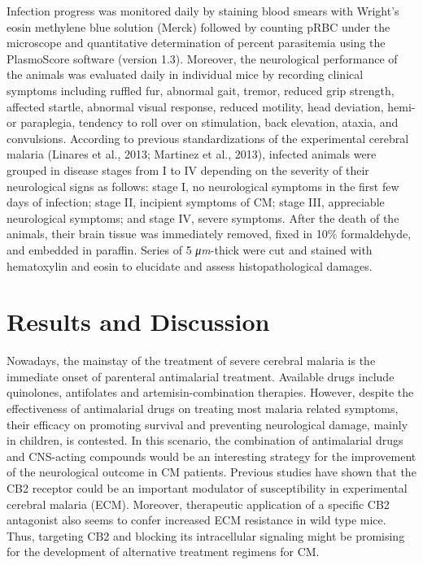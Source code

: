 \documentclass[empirical, authordate, issue]{jote-new-article}
\begin{document}
Infection progress was monitored daily by staining blood smears with Wright's eosin methylene blue solution (Merck) followed by counting pRBC under the microscope and quantitative determination of percent parasitemia using the PlasmoScore software (version 1.3). Moreover, the neurological performance of the animals was evaluated daily in individual mice by recording clinical symptoms including ruffled fur, abnormal gait, tremor, reduced grip strength, affected startle, abnormal visual response, reduced motility, head deviation, hemi- or paraplegia, tendency to roll over on stimulation, back elevation, ataxia, and convulsions. According to previous standardizations of the experimental cerebral malaria (Linares et al., 2013; Martinez et al., 2013), infected animals were grouped in disease stages from I to IV depending on the severity of their neurological signs as follows: stage I, no neurological symptoms in the first few days of infection; stage II, incipient symptoms of CM; stage III, appreciable neurological symptoms; and stage IV, severe symptoms. After the death of the animals, their brain tissue was immediately removed, fixed in 10\% formaldehyde, and embedded in paraffin. Series of 5 \emph{μm}-thick were cut and stained with hematoxylin and eosin to elucidate and assess histopathological damages.


\section{Results and Discussion}

\begin{originalPurpose}
  Nowadays, the mainstay of the treatment of severe cerebral malaria is the immediate onset of parenteral antimalarial treatment. Available drugs include quinolones, antifolates and artemisin-combination therapies. However, despite the effectiveness of antimalarial drugs on treating most malaria related symptoms, their efficacy on promoting survival and preventing neurological damage, mainly in children, is contested. In this scenario, the combination of antimalarial drugs and CNS-acting compounds would be an interesting strategy for the improvement of the neurological outcome in CM patients. Previous studies have shown that the CB2 receptor could be an important modulator of susceptibility in experimental cerebral malaria (ECM). Moreover, therapeutic application of a specific CB2 antagonist also seems to confer increased ECM resistance in wild type mice. Thus, targeting CB2 and blocking its intracellular signaling might be promising for the development of alternative treatment regimens for CM.
\end{originalPurpose}
\end{document}
